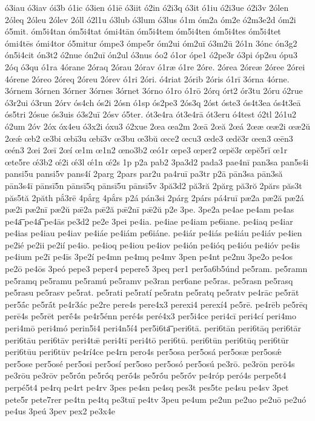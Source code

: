 {ó3iau
ó3iav
ói3b
ó1ic
ó3ien
ó1iē
ó3iit
ó2in
ó2i3q
ó3it
ó1iu
ó2i3ue
ó2i3v
2ólen
2óleq
2óleu
2ólev
2óll
ó2l1u
ó3lub
ó3lum
ó3lus
ó1m
óm2a
óm2e
ó2m3e2d
óm2i
ó5mit.
óm5i4tan
óm5i4tat
ómi4tān
óm5i4tem
óm5i4ten
óm5i4tes
óm5i4tet
ómi4tēs
ómi4tor
ó5mitur
ómpe3
ómpe5r
óm2ui
óm2uī
ó3m2ū
2ó1n
3ónc
ón3g2
ón5i4cit
ón3t2
ó2nue
ón2uī
ón2ul
ó3nus
óo2
ó1or
ópe1
ó2pe3r
ó3pi
óp2su
ópu3
2óq
ó3qu
ó1ra
4órane
2óraq
2órau
2órav
ó1ræ
ó1re
2óre.
2órea
2óreæ
2óree
2órei
4órene
2óreo
2óreq
2óreu
2órev
ó1ri
2óri.
ó4riat
2órib
2óris
ó1rī
3órna
4órne.
3órnem
3órnen
3órner
3órnes
3órnet
3órno
ó1ro
ó1rō
2órq
órt2
ór3tu
2óru
ó2rue
ó3r2ui
ó3run
2órv
ós4ch
ós2i
2ósn
ó1sp
ós2pe3
2ós3q
2óst
óste3
ós4t3ea
ós4t3eā
ós5tri
2ósue
ós3uis
ó3s2uī
2ósv
ó5ter.
ót3e4ra
ót3e4rā
ót3eru
ó4test
ó2tl
2ó1u2
ó2um
2óv
2óx
óx4eu
ó3x2i
óxu3
ó2xue
2œa
œa2m
2œā
2œă
2œá
2œæ
œæ2i
œæ2ŭ
2œǽ
œb2
œ3bi
œbī3u
œbī3v
œ3bu
œ3bŭ
œce2
œcu3
œde3
œdĕ3r
œen3
œēn3
œén3
2œi
2œī
2œí
œ1m
œ1n2
œno3b2
œó1r
œpe3
œper2
œpĕ3r
œpĕ5rĭ
œ1r
œte5re
œ́3b2
œ́2i
œ́3l
œ́1n
œ́2s
1p
p2a
pab2
3pa3d2
pada3
pae4nī
pan3sa
pan5s4i
pansi5u
pansi5v
pans4í
2parg
2pars
par2u
pa4ruī
pa3tr
p2ā
pān3sa
pān3să
pān3s4ī
pānsī5n
pānsī5q
pānsī5u
pānsī5v
3pă3d2
pă3ră
2părg
pă3rŏ
2părs
păs3t
păs5tă
2păth
pắ3rē
4pắrg
4pắrs
p2á
pán3si
2párg
2párs
pá4ruī
pæ2a
pæ2ă
pæ2á
pæ2i
pæ2nī
pæ2ŭ
pǣ2a
pǣ2ă
pǣ2nī
pǣ2ŭ
p2e
3pe.
3pe2a
pe4ae
pe4am
pe4as
pe4a͞
pe4a͡
pe4ās
pe3d2
pe2e
3pei
pe4ia.
pe4iae
pe4iam
pe6iane.
pe4iaq
pe4iar
pe4ias
pe4iau
pe4iav
pe4iáe
pe4iám
pe6iáne.
pe4iár
pe4iás
pe4iáu
pe4iáv
pe4ien
pe2ié
pe2ii
pe2ií
pe4io.
pe4ioq
pe4iou
pe4iov
pe4ión
pe4ióq
pe4ióu
pe4ióv
pe4is
pe4ium
pe2ī
pe4īs
3pe2í
pe4mn
pe4mq
pe4mv
3pen
pe4nt
pe2nu
3pe2o
pe4os
pe2ō
pe4ōs
3peó
pepe3
peper4
pepere5
3peq
per1
per5a6b5únd
pe5ram.
pe5ramn
pe5ramq
pe5ramu
pe5ramú
pe5ramv
pe3ran
per6ane
pe5ras.
pe5rasn
pe5rasq
pe5rasu
pe5rasv
pe5rat.
pe5rati
pe5ratí
pe5ratn
pe5ratq
pe5ratv
pe4rāc
pe5rāt
per5ā́c
pe5rā́t
pe4r3ác
pe2re
pere4s
pere4x3
perexi4
perexí4
pe5rē.
pe4rēb
pe5rēq
perē4s
pe5rēt
perḗ4s
pe4r5énn
peré4s
peré4x3
per5i4ce
peri4cī
peri4cí
peri4mo
peri4mō
peri4mó
perin5i4
peri4n5í4
per5i6ta͞
peri6tā.
peri6tān
peri6tāq
peri6tār
peri6tāu
peri6tāv
peri4tǣ
peri4tī
peri4tō
peri6tū.
peri6tūn
peri6tūq
peri6tūr
peri6tūu
peri6tūv
pe4rí4ce
pe4rn
pero4s
per5osa
per5osá
per5osæ
per5osǽ
per5ose
per5osé
per5osi
per5osí
per5oso
per5osó
per5osú
pe3rō.
pe3rōn
perō4s
pe3rōu
pe3rōv
pe5rṓn
pe5rṓq
perṓ4s
pe5rṓu
pe5rṓv
pe4róp
peró4s
perpe5t4
perpé5t4
pe4rq
pe4rt
pe4rv
3pes
pe4sn
pe4sq
pes3t
pes5te
pe4su
pe4sv
3pet
pete5r
pete7rer
pe4tn
pe4tq
pe3tuī
pe4tv
3peu
pe4um
pe2un
pe2uo
pe2uō
pe2uó
pe4us
3peú
3pev
pex2
pe3x4e
}
